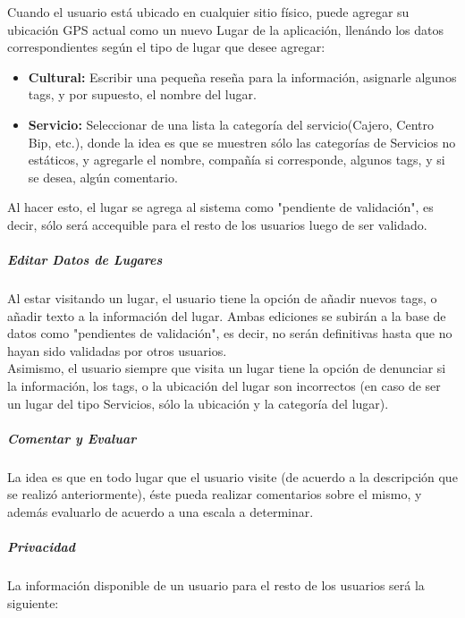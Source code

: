 \documentclass[10pt,letterpaper]{article}
\begin{document}
Cuando el usuario está ubicado en cualquier sitio físico, puede agregar su ubicación GPS actual como un nuevo Lugar de la aplicación, llenándo los datos correspondientes según el tipo de lugar que desee agregar:\\

\begin{itemize}
 \item \textbf{Cultural:} Escribir una pequeña reseña para la información, asignarle algunos tags, y por supuesto, el nombre del lugar.\\

 \item \textbf{Servicio:} Seleccionar de una lista la categoría del servicio(Cajero, Centro Bip, etc.), donde la idea es que se muestren sólo las categorías de Servicios no estáticos, y agregarle el nombre, compañía si corresponde, algunos tags, y si se desea, algún comentario.\\
\end{itemize}

Al hacer esto, el lugar se agrega al sistema como "pendiente de validación", es decir, sólo será accequible para el resto de los usuarios luego de ser validado.\\

\subparagraph{Editar Datos de Lugares}

Al estar visitando un lugar, el usuario tiene la opción de añadir nuevos tags, o añadir texto a la información del lugar. Ambas ediciones se subirán a la base de datos como "pendientes de validación", es decir, no serán definitivas hasta que no hayan sido validadas por otros usuarios.\\

Asimismo, el usuario siempre que visita un lugar tiene la opción de denunciar si la información, los tags, o la ubicación del lugar son incorrectos (en caso de ser un lugar del tipo Servicios, sólo la ubicación y la categoría del lugar).\\


\subparagraph{Comentar y Evaluar}

La idea es que en todo lugar que el usuario visite (de acuerdo a la descripción que se realizó anteriormente), éste pueda realizar comentarios sobre el mismo, y además evaluarlo de acuerdo a una escala a determinar.\\

\subparagraph{Privacidad}

La información disponible de un usuario para el resto de los usuarios será la siguiente:\\
\end{document}
